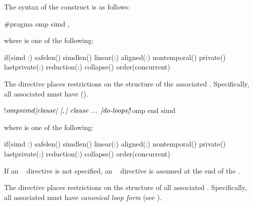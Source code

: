 \syntax
The syntax of the  construct is as follows:

\begin{ccppspecific}
\begin{ompcPragma}
#pragma omp simd \plc{[clause[ [},\plc{] clause] ... ] new-line}
\end{ompcPragma}

where  is one of the following:

{}
\begin{indentedcodelist}
if(\plc{[}simd :\plc{] scalar-expression})
safelen()
simdlen()
linear(\plc{list[ }:\plc{ linear-step]})
aligned(\plc{list[ }:\plc{ alignment]})
nontemporal()
private()
lastprivate(\plc{[ lastprivate-modifier}:\plc{] list})
reduction(\plc{[reduction-modifier}\plc{,]reduction-identifier }:)
collapse()
order(concurrent)
\end{indentedcodelist}

The  directive places restrictions on the structure of the associated .
Specifically, all associated  must have 
().
\end{ccppspecific}

\begin{fortranspecific}
\begin{ompfPragma}
!$omp simd \plc{[clause[ [},\plc{] clause ... ]}
   \plc{do-loops}
\plc{[}!$omp end simd\plc{]}
\end{ompfPragma}

where  is one of the following:

{}
\begin{indentedcodelist}
if(\plc{[}simd :\plc{] scalar-logical-expression})
safelen()
simdlen()
linear(\plc{list[ }:\plc{ linear-step]})
aligned(\plc{list[ }:\plc{ alignment]})
nontemporal()
private()
lastprivate(\plc{[ lastprivate-modifier}:\plc{] list})
reduction(\plc{[reduction-modifier}\plc{,]reduction-identifier }:)
collapse()
order(concurrent)
\end{indentedcodelist}

If an ~ directive is not specified, an ~ directive is assumed at the end
of the .

The  directive places restrictions on the structure of all
associated .  Specifically, all associated  must
have \emph{canonical loop form} (see ).
\end{fortranspecific}

